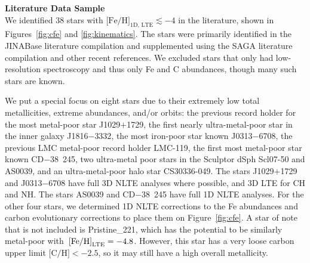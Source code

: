 \documentclass{natureprintstyle}
\newcommand{\unit}[1]{\ensuremath{\mathrm{\,#1}}\xspace}
\newcommand{\feh}{\unit{[Fe/H]}}
\newcommand{\cdstar}{CD$-$38~245\xspace}
\begin{document}
\vspace{1mm}
\noindent
{\bf Literature Data Sample}
\\
\noindent
We identified 38 stars\cite{Cayrel2004,Collet2006,Norris2007,Frebel2008,Lai2008,Cohen2008,Caffau2011,Yong2013,Keller2014,Roederer2014,Hansen2015,Placco2015,Howes2015,Bonifacio2015,Simon2015,Frebel2015,Li2015,Melendez2016,Placco2016,Caffau2016,Bonifacio2018,Starkenburg2018,Aguado2019,Frebel2019,Nordlander2019,GonzalezHernandez2020,Placco2024,Chiti2024,Skuladottir2024} with $\mbox{[Fe/H]}_{\text{1D, LTE}} \lesssim -4$ in the literature, shown in Figures~\ref{fig:cfe} and \ref{fig:kinematics}.
The stars were primarily identified in the JINABase literature compilation\cite{Abohalima2018} and supplemented using the SAGA literature compilation\cite{Suda2008} and other recent references.
We excluded stars that only had low-resolution spectroscopy and thus only Fe and C abundances, though many such stars are known\cite{Aguado2017,AllendePrieto2023}.

We put a special focus on eight stars due to their extremely low total metallicities, extreme abundances, and/or orbits:
the previous record holder for the most metal-poor star J1029$+$1729\cite{Caffau2011,Caffau2012,Lagae2023,Caffau2024}, the first nearly ultra-metal-poor star in the inner galaxy J1816$-$3332\cite{Howes2015}, the most iron-poor star known J0313$-$6708\cite{Keller2014,Nordlander2017}, the previous LMC metal-poor record holder LMC-119\cite{Chiti2024}, the first most metal-poor star known {\cdstar}\cite{Bessell1984,Cayrel2004,Mittal2025}, two ultra-metal poor stars in the Sculptor dSph Scl07-50\cite{Simon2015} and AS0039\cite{Skuladottir2021,Skuladottir2024}, and an ultra-metal-poor halo star CS30336-049\cite{Lai2008}.
The stars J1029$+$1729\cite{Lagae2023} and J0313$-$6708\cite{Nordlander2017} have full 3D NLTE analyses where possible, and 3D LTE for CH and NH.
The stars AS0039\cite{Skuladottir2024} and \cdstar\cite{Mittal2025} have full 1D NLTE analyses.
For the other four stars, we determined 1D NLTE corrections to the Fe abundances\cite{Bergemann2012b} and carbon evolutionary corrections\cite{Placco2014} to place them on Figure~\ref{fig:cfe}.
A star of note that is not included is Pristine\_221\cite{Starkenburg2018}, which has the potential to be similarly metal-poor with $\feh_{\rm LTE} = -4.8$. However, this star has a very loose carbon upper limit $\mbox{[C/H]} < -2.5$\cite{Lardo2021}, so it may still have a high overall metallicity.
\end{document}

